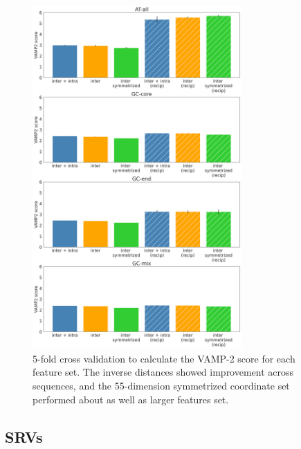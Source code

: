 \documentclass[journal=jpcbfk,manuscript=article]{achemso}
\begin{document}
\begin{figure}[ht!]
	\begin{center}
        \includegraphics[width=80mm,
        scale=0.5]{Figs/figs_imp/all_permute_vamps_nolegend.png}
        \caption{5-fold cross validation to calculate the VAMP-2 score for each feature set. The inverse distances showed improvement across sequences, and the 55-dimension symmetrized coordinate set performed about as well as larger features set.}
        \label{fig:allseq_features_vamp2}
	\end{center}
\end{figure}


\subsection{\label{sec:methods}SRVs}
 
\end{document}
